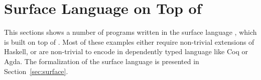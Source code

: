 \newcommand{\framedhslinecorrect}[2]%
  {#1[#2]}

\newcommand{\framedhs}{\sethscode{framedhscode}}


\newenvironment{inlinehscode}%
  {\(\def\column##1##2{}%
   \let\>\undefined\let\<\undefined\let\\\undefined
   \newcommand\>[1][]{}\newcommand\<[1][]{}\newcommand\\[1][]{}%
   \def\fromto##1##2##3{##3}%
   \def\nextline{}}{\) }%

\newcommand{\inlinehs}{\sethscode{inlinehscode}}


\newenvironment{joincode}%
  {\let\orighscode=\hscode
   \let\origendhscode=\endhscode
   \def\endhscode{\def\hscode{\endgroup\def\@currenvir{hscode}\\}\begingroup}
   \orighscode\def\hscode{\endgroup\def\@currenvir{hscode}}}%
  {\origendhscode
   \global\let\hscode=\orighscode
   \global\let\endhscode=\origendhscode}%

\makeatother
\EndFmtInput
%


\section{Surface Language on Top of \name}
\label{sec:app}

 


This sections shows a number of programs written in the surface
language \sufcc, which is built on top of \name. Most of these
examples either require non-trivial extensions of Haskell, or are
non-trivial to encode in dependently typed language like Coq or
Agda. The formalization of the surface language is presented in
Section~\ref{sec:surface}.

